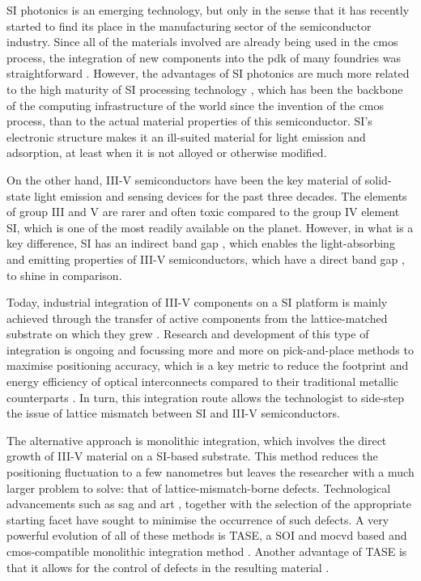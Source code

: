 \Acl{SI} photonics is an emerging technology, but only in the sense that it has recently started to find its place in the manufacturing sector of the semiconductor industry. Since all of the materials involved are already being used in the \acs{cmos} process, the integration of new components into the \acf{pdk} of many foundries was straightforward \cite{Shi2022, Siew2021, Novack2014}. However, the advantages of \acl{SI} photonics are much more related to the high maturity of \acl{SI} processing technology \cite{Novack2014}, which has been the backbone of the computing infrastructure of the world since the invention of the \acs{cmos} process, than to the actual material properties of this semiconductor. \Acl{SI}'s electronic structure makes it an ill-suited material for light emission and adsorption, at least when it is not alloyed or otherwise modified.

On the other hand, III-V semiconductors have been the key material of solid-state light emission \cite{Schlereth1996, Nakamura1994} and sensing \cite{Ting2019, Liang2022} devices for the past three decades. The elements of group III and V are rarer and often toxic compared to the group IV element \acl{SI}, which is one of the most readily available on the planet. However, in what is a key difference, \acl{SI} has an indirect band gap \cite{Chelikowsky1974}, which enables the light-absorbing and emitting properties of III-V semiconductors, which have a direct band gap \cite{Khanin2005}, to shine in comparison.

Today, industrial integration of III-V components on a \acl{SI} platform is mainly achieved through the transfer of active components from the lattice-matched substrate on which they grew \cite{Koch2013, Han2022}. Research and development of this type of integration is ongoing and focussing more and more on pick-and-place methods \cite{McPhillimy2020} to maximise positioning accuracy, which is a key metric to reduce the footprint and energy efficiency of optical interconnects compared to their traditional metallic counterparts \cite{Miller2000, Miller2009}. In turn, this integration route allows the technologist to side-step the issue of lattice mismatch between \acl{SI} and III-V semiconductors.

The alternative approach is monolithic integration, which involves the direct growth of III-V material on a \acl{SI}-based substrate. This method reduces the positioning fluctuation to a few nanometres but leaves the researcher with a much larger problem to solve: that of lattice-mismatch-borne defects. Technological advancements such as \acf{sag} and \acf{art} \cite{Kunert2016, Fiorenza2019}, together with the selection of the appropriate starting facet \cite{Kunert2018} have sought to minimise the occurrence of such defects. A very powerful evolution of all of these methods is \acf{TASE}, a \acf{SOI} and \acf{mocvd} based and \acs{cmos}-compatible \cite{Svensson2023} monolithic integration method \cite{borgTASEp2018, Schmid2015}. Another advantage of \acs{TASE} is that it allows for the control of defects in the resulting material \cite{Knoedler2017, Staudinger2018, Han2020}. 

